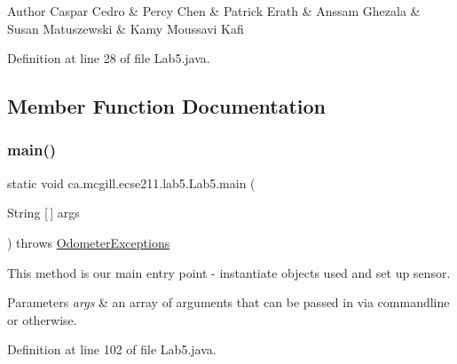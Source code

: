 \begin{DoxyAuthor}{Author}
Caspar Cedro \& Percy Chen \& Patrick Erath \& Anssam Ghezala \& Susan Matuszewski \& Kamy Moussavi Kafi 
\end{DoxyAuthor}


Definition at line 28 of file Lab5.\+java.



\subsection{Member Function Documentation}
\mbox{\label{classca_1_1mcgill_1_1ecse211_1_1lab5_1_1_lab5_a82cca51f550ed0eb016bb2082d3fe755}} 
\subsubsection{\texorpdfstring{main()}{main()}}
{\footnotesize\ttfamily static void ca.\+mcgill.\+ecse211.\+lab5.\+Lab5.\+main (\begin{DoxyParamCaption}\item[{String \mbox{[}$\,$\mbox{]}}]{args }\end{DoxyParamCaption}) throws \hyperlink{classca_1_1mcgill_1_1ecse211_1_1odometer_1_1_odometer_exceptions}{Odometer\+Exceptions}\hspace{0.3cm}{\ttfamily [static]}}

This method is our main entry point -\/ instantiate objects used and set up sensor.


\begin{DoxyParams}{Parameters}
{\em args} & an array of arguments that can be passed in via commandline or otherwise. \\
\hline
\end{DoxyParams}


Definition at line 102 of file Lab5.\+java.

